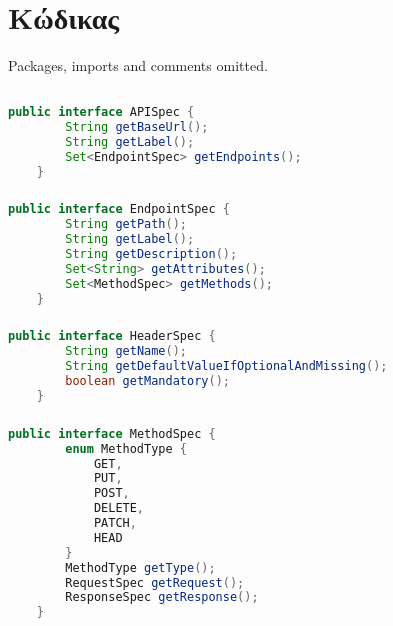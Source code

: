 \chapter{Κώδικας }


Packages, imports and comments omitted.

\section{}

\subsection{}

\begin{lstlisting}[language=Java]
    public interface APISpec {
        String getBaseUrl();
        String getLabel();
        Set<EndpointSpec> getEndpoints();
    }
\end{lstlisting}

\subsection{}

\begin{lstlisting}[language=Java]
    public interface EndpointSpec {
        String getPath();
        String getLabel();
        String getDescription();
        Set<String> getAttributes();
        Set<MethodSpec> getMethods();
    }    
\end{lstlisting}

\subsection{}

\begin{lstlisting}[language=Java]
    public interface HeaderSpec {
        String getName();
        String getDefaultValueIfOptionalAndMissing();
        boolean getMandatory();
    }    
\end{lstlisting}

\subsection{}

\begin{lstlisting}[language=Java]
    public interface MethodSpec {
        enum MethodType {
            GET,
            PUT,
            POST,
            DELETE,
            PATCH,
            HEAD
        }
        MethodType getType();
        RequestSpec getRequest();
        ResponseSpec getResponse();
    }
\end{lstlisting}

